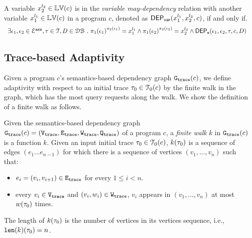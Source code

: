 \begin{defn}
  \label{def:var_dep}
  A variable ${x}_2^{l_2} \in \mathbb{LV}(c)$ is in the \emph{variable may-dependency} relation with another
  variable ${x}_1^{l_1} \in \mathbb{LV}(c)$ in a program ${c}$, denoted as 
  $\mathsf{DEP_{var}}({x}_1^{l_1}, {x}_2^{l_2}, {c})$, if and only if.
\[
  \begin{array}{l}
\exists \event_1, \event_2 \in \eventset^{\asn}, \trace \in \mathcal{T} , D \in \dbdom \st
\pi_{1}{(\event_1)}^{\pi_{2}{(\event_1)}} = {x}_1^{l_1}
\land
\pi_{1}{(\event_2)}^{\pi_{2}{(\event_2)}} = {x}_2^{l_2}%
\land 
\eventdep(\event_1, \event_2, \trace, c, D) 
  \end{array}
\]  %
  \end{defn}
\subsection{Trace-based Adaptivity}
Given 
a program $c$'s semantics-based dependency graph 
$\mathtt{{G_{trace}}}({c})$,
we define adaptivity 
with respect to an initial trace $\mathtt{\tau}_0 \in \mathcal{T}_0(c)$ by the finite walk in the graph, which has the most query requests along the walk.
We show the definition of a finite walk as follows.

\begin{defn}
\label{def:finitewalk}
Given the semantics-based dependency graph $\mathtt{{G_{trace}}}({c}) = (\mathtt{{V_{trace}}}, \mathtt{{E_{trace}}}, \mathtt{{W_{trace}}}, \mathtt{{Q_{trace}}})$ of a program $c$, a \emph{finite walk} $k$ in $\mathtt{{G_{trace}}}({c})$ is a function $k$.
Given an input initial trace $\mathtt{\tau}_0 \in \mathcal{T}_0(c)$, $k(\mathtt{\tau}_0)$ is a sequence of edges $(e_1 \ldots e_{n - 1})$ 
for which there is a sequence of vertices $(v_1, \ldots, v_{n})$ such that:
\begin{itemize}
\item $e_i = (v_{i},v_{i + 1}) \in \mathtt{{E_{trace}}}$ for every $1 \leq i < n$.
\item every $v_i \in \mathtt{{V_{trace}}}$ and $(v_i, w_i) \in \mathtt{{W_{trace}}}$, $v_i$ appears in $(v_1, \ldots, v_{n})$ at most $w(\mathtt{\tau}_0)$ times.  
\end{itemize}
The length of $k(\mathtt{\tau}_0)$ is the number of vertices in its vertices sequence, i.e., $\mathtt{len}(k)(\mathtt{\tau}_0) = n$.
\end{defn} 

